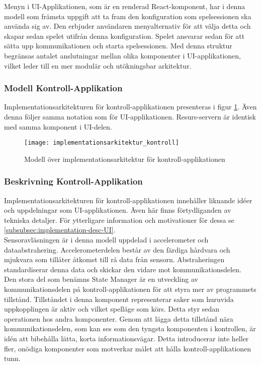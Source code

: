 Menyn i UI-Applikationen, som är en renderad React-komponent, har i denna modell som främsta uppgift att ta fram den konfiguration som spelsessionen ska använda sig av. Den erbjuder användaren menyalternativ för att välja detta och skapar sedan spelet utifrån denna konfiguration. Spelet ansvarar sedan för att sätta upp kommunikationen och starta spelsessionen. Med denna struktur begränsas antalet anslutningar mellan olika komponenter i UI-applikationen, vilket leder till en mer modulär och utökningsbar arkitektur.\\

\subsubsection{Modell Kontroll-Applikation}
Implementationsarkitekturen för kontroll-applikationen presenteras i figur \ref{fig:implementationsarkitektur-kontroll}. Även denna följer samma notation som för UI-applikationen. Resurs-servern är identisk med samma komponent i UI-delen.

\begin{figure}[h]
    \centering
    \texttt{[image: implementationsarkitektur\_kontroll]}
    \caption{Modell över implementationsarkitektur för kontroll-applikationen}
    \label{fig:implementationsarkitektur-kontroll}
\end{figure}

\subsubsection{Beskrivning Kontroll-Applikation}
Implementationsarkitekturen för kontroll-applikationen innehåller liknande idéer och uppdelningar som UI-applikationen. Även här finns förtydliganden av tekniska detaljer. För ytterligare information och motivationer för dessa se \ref{subsubsec:implementation-desc-UI}.\\

Sensoravläsningen är i denna modell uppdelad i accelerometer och dataabstrahering. Accelerometerdelen består av den färdiga hårdvara och mjukvara som tillåter åtkomst till rå data från sensorn. Abstraheringen standardiserar denna data och skickar den vidare mot kommunikationsdelen.\\

Den stora del som benämns State Manager är en utveckling av kommunikationsdelen på kontroll-applikationen för att styra mer av programmets tillstånd. Tillståndet i denna komponent representerar saker som huruvida uppkopplingen är aktiv och vilket spelläge som körs. Detta styr sedan operationen hos andra komponenter. Genom att lägga detta tillstånd nära kommunikationsdelen, som kan ses som den tyngsta komponenten i kontrollen, är idén att bibehålla lätta, korta informationsvägar. Detta introducerar inte heller fler, onödiga komponenter som motverkar målet att hålla kontroll-applikationen tunn.\\
